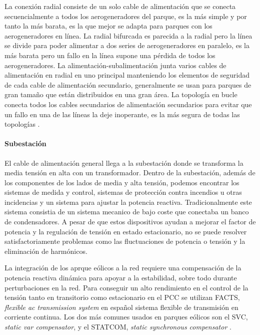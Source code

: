 \documentclass{book}
\begin{document}
La conexi\'on radial consiste de un solo cable de alimentaci\'on que se conecta secuencialmente a todos los aerogeneradores del parque, es la m\'as simple y por tanto la m\'as barata, es la que mejor se adapta para parques con los aerogeneradores en l\'inea. La radial bifurcada es parecida a la radial pero la l\'inea se divide para poder alimentar a dos series de aerogeneradores en paralelo, es la m\'as barata pero un fallo en la l\'inea supone una p\'erdida de todos los aerogeneradores. La alimentaci\'on-subalimentaci\'on junta varios cables de alimentaci\'on en radial en uno principal manteniendo los elementos de seguridad de cada cable de alimentaci\'on secundario, generalmente se usan para parques de gran tamaño que est\'an distribuidos en una gran \'area. La topolog\'ia en bucle conecta todos los cables secundarios de alimentaci\'on secundarios para evitar que un fallo en una de las l\'ineas la deje inoperante, es la m\'as segura de todas las topolog\'ias \cite{ComunicationTopologies}.\par
		\paragraph {Subestaci\'on}
El cable de alimentaci\'on general llega a la subestaci\'on donde se transforma la media tensi\'on en alta con un transformador. Dentro de la subestaci\'on, adem\'as de los componentes de los lados de media y alta tensi\'on, podemos encontrar los sistemas de medida y control, sistemas de protecci\'on contra incendios u otras incidencias y un sistema para ajustar la potencia reactiva. Tradicionalmente este sistema consistia de un sistema mecanico de bajo coste que conectaba un banco de condensadores. A pesar de que estos dispositivos ayudan a mejorar el factor de potencia y la regulaci\'on de tensi\'on en estado estacionario, no se puede resolver satisfactoriamente problemas como las fluctuaciones de potencia o tensi\'on y la eliminaci\'on de harm\'onicos. \par

La integraci\'on de los aprque e\'olicos a la red requiere una compensaci\'on de la potencia reactiva din\'amica para apoyar a la estabilidad, sobre todo durante perturbaciones en la red. Para conseguir un alto rendimiento en el control de la tensi\'on tanto en transitorio como estacionario en el PCC se utilizan FACTS, \emph{flexible ac transmission system} en español sistema flexible de transmisi\'on en corriente continua. Los dos m\'as comunes usados en parques e\'olicos son el SVC, \emph{static var compensator}, y el STATCOM, \emph{static synchronous compensator} \cite{FACTS}.  \par
\end{document}
